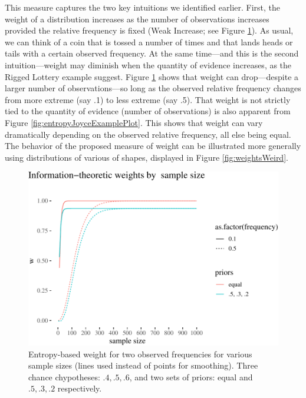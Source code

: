 \documentclass[
  10pt,
  dvipsnames,enabledeprecatedfontcommands]{scrartcl}
\begin{document}
This measure captures the two key intuitions we identified earlier.
First, the weight of a distribution increases as the number of
observations increases provided the relative frequency is fixed (Weak
Increase; see Figure \ref{fig:entropyJoyceExampleSampleSize}). As usual,
we can think of a coin that is tossed a number of times and that lands
heads or tails with a certain observed frequency. At the same time---and
this is the second intuition---weight may diminish when the quantity of
evidence increases, as the Rigged Lottery example suggest. Figure
\ref{fig:entropyJoyceExampleSampleSize} shows that weight can
drop---despite a larger number of observations---so long as the observed
relative frequency changes from more extreme (say .1) to less extreme
(say .5). That weight is not strictly tied to the quantity of evidence
(number of observations) is also apparent from Figure
\ref{fig:entropyJoyceExamplePlot}. This shows that weight can vary
dramatically depending on the observed relative frequency, all else
being equal. The behavior of the proposed measure of weight can be
illustrated more generally using distributions of various of shapes,
displayed in Figure \ref{fig:weightsWeird}.

\begin{figure}

\begin{center}\includegraphics[width=0.7\linewidth]{paper-outline_files/figure-latex/entropyJoyceExampleSampleSize-1} \end{center}

\caption{Entropy-based weight for two observed frequencies for various sample sizes (lines used instead of points for smoothing). Three chance chypotheses: $.4, .5, .6$, and two sets of priors: equal and $.5, .3, .2$ respectively.}
\label{fig:entropyJoyceExampleSampleSize}
\end{figure}
\end{document}
